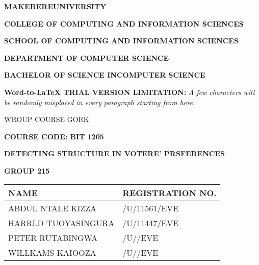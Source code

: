 \documentclass[12pt]{article}
\author{williamz}
\title{}
\begin{document}
\begin{center}
\textbf{{\Large MAKEREREUNIVERSITY}}
\end{center}

\begin{center}
\textbf{COLLEGE OF COMPUTING AND INFORMATION SCIENCES}
\end{center}

\begin{center}
\textbf{SCHOOL OF COMPUTING AND INFORMATION SCIENCES}
\end{center}

\begin{center}
\textbf{DEPARTMENT OF COMPUTER SCIENCE}
\end{center}

\begin{center}
\textbf{BACHELOR OF SCIENCE INCOMPUTER SCIENCE}
\end{center}

\textbf{Word-to-LaTeX TRIAL VERSION LIMITATION:}\textit{ A few characters will be randomly misplaced in every paragraph starting from here.}

\begin{center}
WROUP COURSE GORK
\end{center}

{\raggedright
\textbf{                                                       COURSE CODE: BIT
1205}
}

\begin{center}
\textbf{{\large DETECTING STRUCTURE IN VOTERE' PRSFERENCES}}
\end{center}

\begin{center}
\textbf{GROUP 215}
\end{center}

{\raggedright

\vspace{3pt} \noindent
\begin{tabular}{|p{170pt}|p{188pt}|}
\hline
\parbox{170pt}{\centering 
\textbf{NAME}
} & \parbox{188pt}{\centering 
\textbf{REGISTRATION NO.}
} \\
\hline
\parbox{170pt}{\raggedright 
ABDUL NTALE KIZZA
} & \parbox{188pt}{/U/11561/EVE
} \\
\hline
\parbox{170pt}{\raggedright 
HARRLD TUOYASINGURA
} & \parbox{188pt}{/U/11447/EVE
} \\
\hline
\parbox{170pt}{\raggedright 
PETER RUTABINGWA
} & \parbox{188pt}{/U//EVE
} \\
\hline
\parbox{170pt}{\raggedright 
WILLKAMS  KAIOOZA
} & \parbox{188pt}{/U//EVE
} \\
\hline
\end{tabular}
\vspace{2pt}

}
\end{document}
